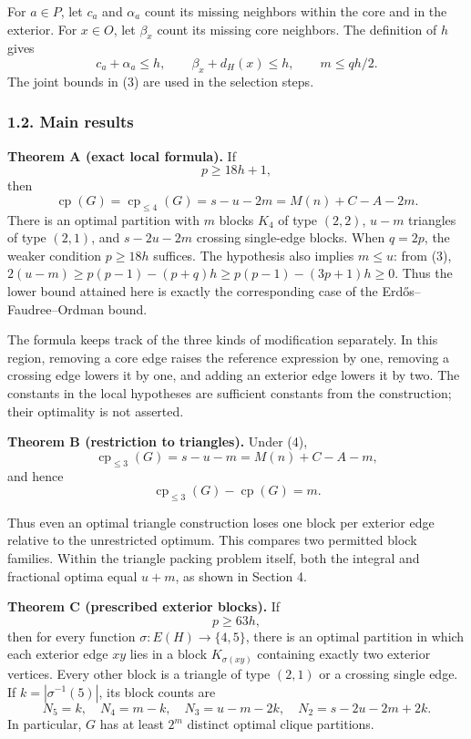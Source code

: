 \documentclass[english,11pt,a4paper]{article}
\begin{document}
For \(a\in P\), let \(c_a\) and \(\alpha_a\) count its missing neighbors
within the core and in the exterior. For \(x\in O\), let \(\beta_x\)
count its missing core neighbors. The definition of \(h\) gives \[
c_a+\alpha_a\le h,\qquad \beta_x+d_H(x)\le h,
\qquad m\le qh/2. \tag{3}
\] The joint bounds in (3) are used in the selection steps.

\subsubsection{1.2. Main results}\label{main-results}

\textbf{Theorem A (exact local formula).} If \[
p\ge18h+1, \tag{4}
\] then \[
\operatorname{cp}(G)=\operatorname{cp}_{\le4}(G)
=s-u-2m=M(n)+C-A-2m. \tag{5}
\] There is an optimal partition with \(m\) blocks \(K_4\) of type
\((2,2)\), \(u-m\) triangles of type \((2,1)\), and \(s-2u-2m\) crossing
single-edge blocks. When \(q=2p\), the weaker condition \(p\ge18h\)
suffices. The hypothesis also implies \(m\le u\): from (3),
\(2(u-m)\ge p(p-1)-(p+q)h\ge p(p-1)-(3p+1)h\ge0\). Thus the lower bound
attained here is exactly the corresponding case of the
Erdős--Faudree--Ordman bound.

The formula keeps track of the three kinds of modification separately.
In this region, removing a core edge raises the reference expression by
one, removing a crossing edge lowers it by one, and adding an exterior
edge lowers it by two. The constants in the local hypotheses are
sufficient constants from the construction; their optimality is not
asserted.

\textbf{Theorem B (restriction to triangles).} Under (4), \[
\operatorname{cp}_{\le3}(G)=s-u-m=M(n)+C-A-m, \tag{6}
\] and hence \[
\operatorname{cp}_{\le3}(G)-\operatorname{cp}(G)=m. \tag{7}
\]

Thus even an optimal triangle construction loses one block per exterior
edge relative to the unrestricted optimum. This compares two permitted
block families. Within the triangle packing problem itself, both the
integral and fractional optima equal \(u+m\), as shown in Section 4.

\textbf{Theorem C (prescribed exterior blocks).} If \[
p\ge63h, \tag{8}
\] then for every function \(\sigma:E(H)\to\{4,5\}\), there is an
optimal partition in which each exterior edge \(xy\) lies in a block
\(K_{\sigma(xy)}\) containing exactly two exterior vertices. Every other
block is a triangle of type \((2,1)\) or a crossing single edge. If
\(k=|\sigma^{-1}(5)|\), its block counts are \[
N_5=k,\quad N_4=m-k,\quad N_3=u-m-2k,
\quad N_2=s-2u-2m+2k. \tag{9}
\] In particular, \(G\) has at least \(2^m\) distinct optimal clique
partitions.
\end{document}
